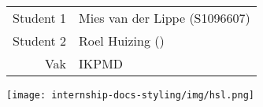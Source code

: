 \begin{titlepage}
	
	\stylizedtitle
	\stylizedauthor
	\titlepageversion
	
	\vfill
	
	\begin{tabular}{rl}
		Student 1 & Mies van der Lippe (S1096607)\\
		Student 2 & Roel Huizing ()\\
		Vak		  & IKPMD \\
	\end{tabular}
	
	\vspace{10mm}
	
	\hfill
	\texttt{[image: internship-docs-styling/img/hsl.png]}	
	
\end{titlepage}